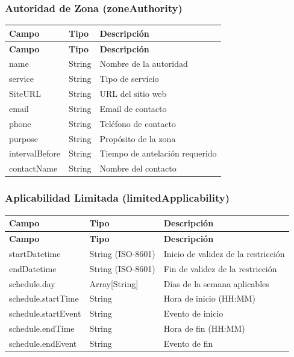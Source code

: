 \documentclass[12pt,a4paper]{article}
\begin{document}
\subsubsection{Autoridad de Zona (zoneAuthority)}
\begin{longtable}{|p{4cm}|p{2.5cm}|p{8.5cm}|}
\hline
\textbf{Campo} & \textbf{Tipo} & \textbf{Descripción} \\
\hline
\endfirsthead
\hline
\textbf{Campo} & \textbf{Tipo} & \textbf{Descripción} \\
\hline
\endhead
\hline
\endfoot
\hline
\endlastfoot
name & String & Nombre de la autoridad \\
\hline
service & String & Tipo de servicio \\
\hline
SiteURL & String & URL del sitio web \\
\hline
email & String & Email de contacto \\
\hline
phone & String & Teléfono de contacto \\
\hline
purpose & String & Propósito de la zona \\
\hline
intervalBefore & String & Tiempo de antelación requerido \\
\hline
contactName & String & Nombre del contacto \\
\hline
\end{longtable}

\subsubsection{Aplicabilidad Limitada (limitedApplicability)}
\begin{longtable}{|p{4cm}|p{2.5cm}|p{8.5cm}|}
\hline
\textbf{Campo} & \textbf{Tipo} & \textbf{Descripción} \\
\hline
\endfirsthead
\hline
\textbf{Campo} & \textbf{Tipo} & \textbf{Descripción} \\
\hline
\endhead
\hline
\endfoot
\hline
\endlastfoot
startDatetime & String (ISO-8601) & Inicio de validez de la restricción \\
\hline
endDatetime & String (ISO-8601) & Fin de validez de la restricción \\
\hline
schedule.day & Array[String] & Días de la semana aplicables \\
\hline
schedule.startTime & String & Hora de inicio (HH:MM) \\
\hline
schedule.startEvent & String & Evento de inicio \\
\hline
schedule.endTime & String & Hora de fin (HH:MM) \\
\hline
schedule.endEvent & String & Evento de fin \\
\hline
\end{longtable}
\end{document}
